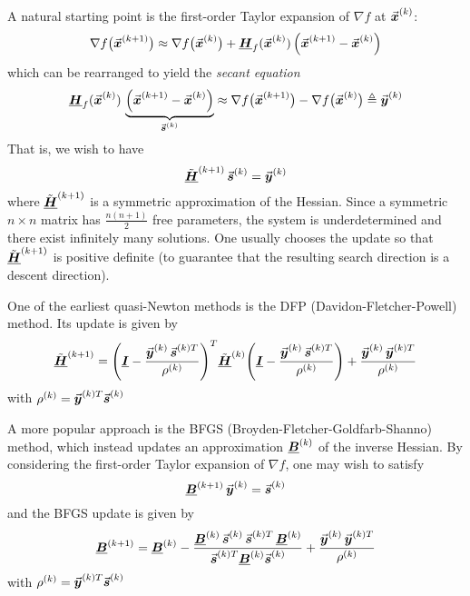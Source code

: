 A natural starting point is the first-order Taylor expansion of \(\nabla f\) at \(\vec{\boldsymbol{x}}^{(k)}\):
\[
\nabla f\bigl(\vect{x}^{(k+1)}\bigr) \approx \nabla f\bigl(\vect{x}^{(k)}\bigr) + \matr{H}_{f}(\vect{x}^{(k)})\,\Bigl(\vect{x}^{(k+1)} - \vect{x}^{(k)}\Bigr) %
\]
which can be rearranged to yield the \emph{secant equation}
\[
\matr{H}_{f}(\vect{x}^{(k)})\, \underbrace{\Bigl(\vect{x}^{(k+1)} - \vect{x}^{(k)}\Bigr)}_{\vect{s}^{(k)}} \approx \nabla f\bigl(\vect{x}^{(k+1)}\bigr) - \nabla f\bigl(\vect{x}^{(k)}\bigr) \triangleq \vect{y}^{(k)} %
\]
That is, we wish to have
\[
\tilde{\matr{H}}^{(k+1)}\, \vect{s}^{(k)} = \vect{y}^{(k)} %
\]
where \(\tilde{\underline{\boldsymbol{H}}}^{(k+1)}\) is a symmetric approximation of the Hessian. Since a symmetric \(n \times n\) matrix has \(\frac{n(n+1)}{2}\) free parameters, the system is underdetermined and there exist infinitely many solutions. One usually chooses the update so that \(\tilde{\underline{\boldsymbol{H}}}^{(k+1)}\) is positive definite (to guarantee that the resulting search direction is a descent direction).

One of the earliest quasi-Newton methods is the DFP (Davidon-Fletcher-Powell) method. Its update is given by
\[
\tilde{\matr{H}}^{(k+1)} = \Biggl(\matr{I} - \frac{\vect{y}^{(k)}\, \vect{s}^{(k)T}}{\rho^{(k)}}\Biggr)^T \tilde{\matr{H}}^{(k)} \Biggl(\matr{I} - \frac{\vect{y}^{(k)}\, \vect{s}^{(k)T}}{\rho^{(k)}}\Biggr) + \frac{\vect{y}^{(k)}\,\vect{y}^{(k)T}}{\rho^{(k)}} %
\]
with
\(
\rho^{(k)} = \vect{y}^{(k)T} \vect{s}^{(k)} %
\)

A more popular approach is the BFGS (Broyden-Fletcher-Goldfarb-Shanno) method, which instead updates an approximation \(\underline{\boldsymbol{B}}^{(k)}\) of the inverse Hessian. By considering the first-order Taylor expansion of \(\nabla f\), one may wish to satisfy
\[
\matr{B}^{(k+1)}\, \vect{y}^{(k)} = \vect{s}^{(k)} %
\]
and the BFGS update is given by
\[
\matr{B}^{(k+1)} = \matr{B}^{(k)} - \frac{\matr{B}^{(k)}\, \vect{s}^{(k)}\, \vect{s}^{(k)T}\, \matr{B}^{(k)}}{\vect{s}^{(k)T}\matr{B}^{(k)}\vect{s}^{(k)}} + \frac{\vect{y}^{(k)}\, \vect{y}^{(k)T}}{\rho^{(k)}} %
\]
with
\(
\rho^{(k)} = \vect{y}^{(k)T} \vect{s}^{(k)} %
\)
















































